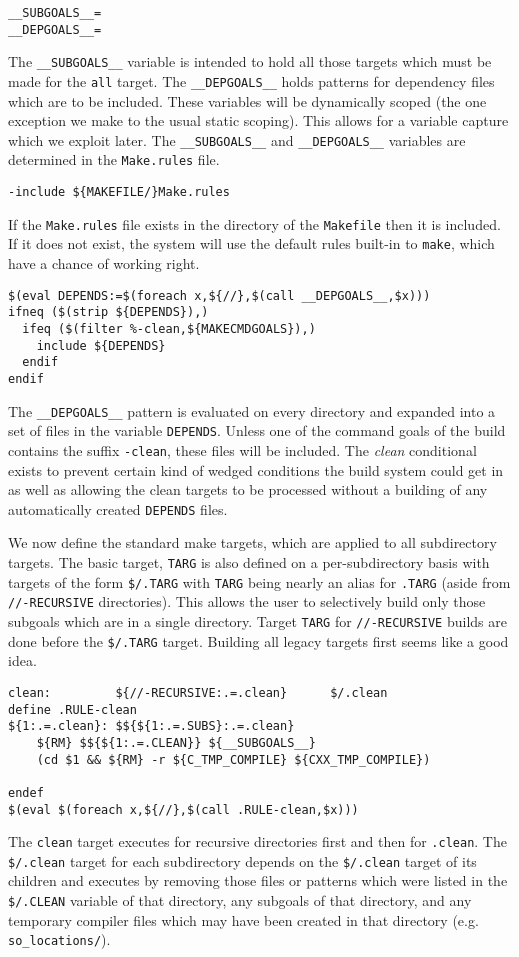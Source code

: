\documentclass[letterpaper]{article}
\begin{document}
\begin{verbatim}
__SUBGOALS__=
__DEPGOALS__=
\end{verbatim}
The \verb+__SUBGOALS__+ variable is intended to hold all those targets
which must be made for the \verb+all+ target.  The \verb+__DEPGOALS__+
holds patterns for dependency files which are to be included.
These variables will be
dynamically scoped (the one exception we make to the usual static scoping).
This allows for a variable capture which we exploit later.  The
\verb+__SUBGOALS__+ and \verb+__DEPGOALS__+ variables are
determined in the \verb+Make.rules+
file.

\begin{verbatim}
-include ${MAKEFILE/}Make.rules
\end{verbatim}
If the \verb+Make.rules+ file exists in the directory of the 
\verb+Makefile+ then it is included.  If it does not exist, the system will
use the default rules built-in to \verb+make+, which have a
chance of working right.

\begin{verbatim}
$(eval DEPENDS:=$(foreach x,${//},$(call __DEPGOALS__,$x)))
ifneq ($(strip ${DEPENDS}),)
  ifeq ($(filter %-clean,${MAKECMDGOALS}),)
    include ${DEPENDS}
  endif
endif
\end{verbatim}
The \verb+__DEPGOALS__+ pattern is evaluated on every directory and
expanded into a set of files in the variable \verb+DEPENDS+.  Unless
one of the command goals of the build contains the suffix \verb+-clean+,
these files will be included.  The {\em clean} conditional exists to
prevent certain kind of wedged conditions the build system could get
in as well as allowing the clean targets to be processed without a
building of any automatically created \verb+DEPENDS+ files.

We now define the standard make targets, which are applied to all
subdirectory targets.  The basic target, \verb+TARG+ is also defined
on a per-subdirectory basis with targets of the form \verb+$/.TARG+
with \verb+TARG+ being nearly an alias for \verb+.TARG+ (aside from
\verb+//-RECURSIVE+ directories).  This allows
the user to selectively build only those subgoals which are in a
single directory.  Target \verb+TARG+ for \verb+//-RECURSIVE+ builds are
done before the \verb+$/.TARG+ target.  Building all legacy targets
first seems like a good idea.

\begin{verbatim}
clean:         ${//-RECURSIVE:.=.clean}      $/.clean
define .RULE-clean
${1:.=.clean}: $${${1:.=.SUBS}:.=.clean}
	${RM} $${${1:.=.CLEAN}} ${__SUBGOALS__}
	(cd $1 && ${RM} -r ${C_TMP_COMPILE} ${CXX_TMP_COMPILE})

endef
$(eval $(foreach x,${//},$(call .RULE-clean,$x)))
\end{verbatim}
The \verb+clean+ target executes for recursive directories first
and then for \verb+.clean+.  The \verb+$/.clean+ target for
each subdirectory depends on the \verb+$/.clean+ target of its
children and executes by removing those files or patterns which were listed
in the \verb+$/.CLEAN+ variable of that directory, any subgoals of
that directory, and any temporary compiler files which may have been
created in that directory (e.g. \verb+so_locations/+).
\end{document}
